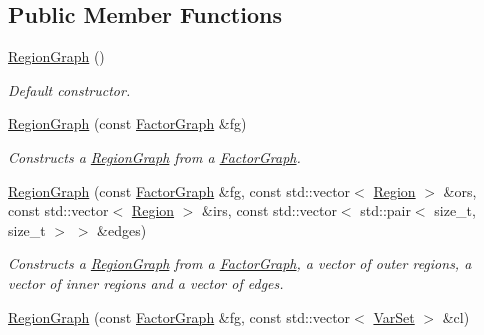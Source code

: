 \subsection*{Public Member Functions}
\begin{CompactItemize}
\item 
\hypertarget{classdai_1_1RegionGraph_3d60a9dbf05e5b203ccbe021d8d3b080}{
\hyperlink{classdai_1_1RegionGraph_3d60a9dbf05e5b203ccbe021d8d3b080}{RegionGraph} ()}
\label{classdai_1_1RegionGraph_3d60a9dbf05e5b203ccbe021d8d3b080}

\begin{CompactList}\small\item\em Default constructor. \item\end{CompactList}\item 
\hypertarget{classdai_1_1RegionGraph_ebc7b75de029b1915d1b86e3a769bb9f}{
\hyperlink{classdai_1_1RegionGraph_ebc7b75de029b1915d1b86e3a769bb9f}{RegionGraph} (const \hyperlink{classdai_1_1FactorGraph}{FactorGraph} \&fg)}
\label{classdai_1_1RegionGraph_ebc7b75de029b1915d1b86e3a769bb9f}

\begin{CompactList}\small\item\em Constructs a \hyperlink{classdai_1_1RegionGraph}{RegionGraph} from a \hyperlink{classdai_1_1FactorGraph}{FactorGraph}. \item\end{CompactList}\item 
\hypertarget{classdai_1_1RegionGraph_e5c5becfae3721397e6958e05499e1e5}{
\hyperlink{classdai_1_1RegionGraph_e5c5becfae3721397e6958e05499e1e5}{RegionGraph} (const \hyperlink{classdai_1_1FactorGraph}{FactorGraph} \&fg, const std::vector$<$ \hyperlink{classdai_1_1Region}{Region} $>$ \&ors, const std::vector$<$ \hyperlink{classdai_1_1Region}{Region} $>$ \&irs, const std::vector$<$ std::pair$<$ size\_\-t, size\_\-t $>$ $>$ \&edges)}
\label{classdai_1_1RegionGraph_e5c5becfae3721397e6958e05499e1e5}

\begin{CompactList}\small\item\em Constructs a \hyperlink{classdai_1_1RegionGraph}{RegionGraph} from a \hyperlink{classdai_1_1FactorGraph}{FactorGraph}, a vector of outer regions, a vector of inner regions and a vector of edges. \item\end{CompactList}\item 
\hypertarget{classdai_1_1RegionGraph_bbb85bc05de8136b5ff12ba66df7867b}{
\hyperlink{classdai_1_1RegionGraph_bbb85bc05de8136b5ff12ba66df7867b}{RegionGraph} (const \hyperlink{classdai_1_1FactorGraph}{FactorGraph} \&fg, const std::vector$<$ \hyperlink{classdai_1_1VarSet}{VarSet} $>$ \&cl)}
\label{classdai_1_1RegionGraph_bbb85bc05de8136b5ff12ba66df7867b}


\end{CompactItemize}
